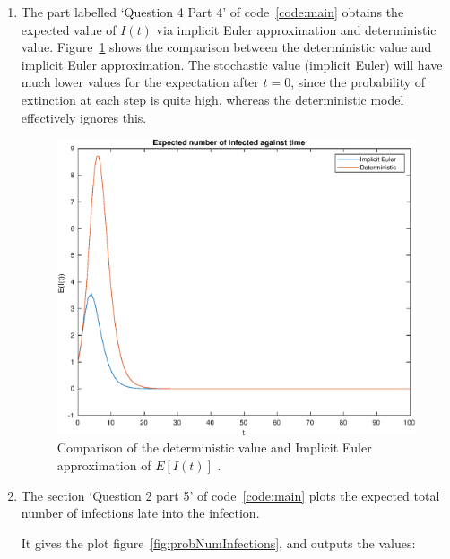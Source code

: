 \documentclass{/home/janmebows/Documents/LatexTemplates/myassignment}
\begin{document}
\begin{enumerate}
\begin{enumerate}[label=(\roman*)]
		\item %
				The part labelled `Question 4 Part 4' of code~\ref{code:main} obtains the expected value of $I(t)$ via implicit Euler approximation and deterministic value. Figure~\ref{fig:detandstocEIT} shows the comparison between the deterministic value and implicit Euler approximation. The stochastic value (implicit Euler) will have much lower values for the expectation after $t=0$, since the probability of extinction at each step is quite high, whereas the deterministic model effectively ignores this.

		\begin{figure}[h]
			\centering
			\label{fig:detandstocEIT}
			\includegraphics[width=\linewidth]{TopicBA2Q24}
			\caption{Comparison of the deterministic value and Implicit Euler approximation of $E[I(t)]$ .}
		\end{figure}
		\item %

				The section `Question 2 part 5' of code~\ref{code:main} plots the expected total number of infections late into the infection.  
				
				It gives the plot figure~\ref{fig:probNumInfections}, and outputs the values:
				\begin{verbatim}


\end{verbatim}
\end{enumerate}
\end{enumerate}
\end{document}
